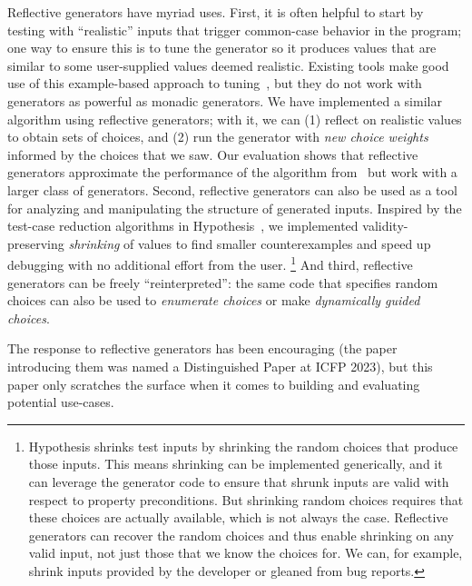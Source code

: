 Reflective generators have myriad uses. First,
%
it is often helpful to start by testing with
``realistic'' inputs that trigger common-case behavior in the program;
one way to ensure this is to tune the generator so
it produces values that are similar to some user-supplied values deemed
realistic. Existing tools make good use of this example-based approach to
tuning~\cite{soremekun2020inputs}, but they do not work with generators as
powerful as monadic generators. We have implemented a
similar algorithm using
reflective generators; with it, we can (1) reflect on realistic values to
obtain sets of choices, and (2) run the generator with {\em new choice weights}
informed by the choices that we saw. Our evaluation shows that reflective
generators approximate the performance of the algorithm
from~\cite{soremekun2020inputs} but work with a larger class of generators.
%
Second,
reflective generators can also be used as a tool for analyzing and
manipulating the structure of generated inputs. Inspired by the test-case
reduction algorithms in Hypothesis~\cite{maciver_test-case_2020}, we implemented
validity-preserving {\em shrinking} of values to find smaller counterexamples
and speed up debugging with no additional effort from the user.%
%
\footnote{%
\normalsize
Hypothesis shrinks test inputs by shrinking the random choices
that produce those
inputs. This means shrinking can be implemented
generically, and it can leverage the generator code to ensure that shrunk
inputs are valid with respect to property preconditions.  But shrinking
random choices requires that these choices are actually available, which
is not always the case. Reflective generators
can
recover the random choices and thus enable shrinking
on any
valid input, not just those that we know the choices for.  We can, for
example, shrink inputs provided by the developer or
gleaned from bug reports.
}
%
And third, reflective generators can be freely
``reinterpreted'': the same code that specifies random choices can
also be used to {\em enumerate choices} or make {\em dynamically guided choices}.

%
The response to reflective generators has been encouraging (the paper
introducing them was named a Distinguished Paper at ICFP 2023), but
this paper only scratches the surface when it comes to building and
evaluating potential use-cases.

